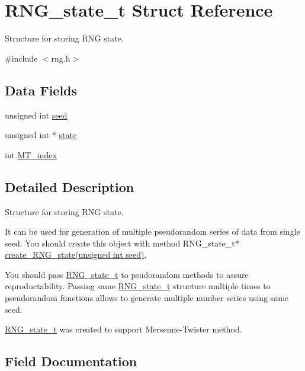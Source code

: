 \hypertarget{structRNG__state__t}{}\section{R\+N\+G\+\_\+state\+\_\+t Struct Reference}
\label{structRNG__state__t}


Structure for storing R\+NG state.  




{\ttfamily \#include $<$rng.\+h$>$}

\subsection*{Data Fields}
\begin{DoxyCompactItemize}
\item 
unsigned int \hyperlink{structRNG__state__t_a5c04ee01672b14c4c6f5d21c45aeb371}{seed}
\item 
unsigned int $\ast$ \hyperlink{structRNG__state__t_a7eb0b3b656d81709d34ecb90ccb21e73}{state}
\item 
int \hyperlink{structRNG__state__t_adc72303a30c6f8a62bdf019191d83acc}{M\+T\+\_\+index}
\end{DoxyCompactItemize}


\subsection{Detailed Description}
Structure for storing R\+NG state. 

It can be used for generation of multiple pseudorandom series of data from single seed. You should create this object with method R\+N\+G\+\_\+state\+\_\+t$\ast$ \hyperlink{rng_8h_af9c03e9b659b227ab093957cbfc57847}{create\+\_\+\+R\+N\+G\+\_\+state(unsigned int seed)}.

You should pass \hyperlink{structRNG__state__t}{R\+N\+G\+\_\+state\+\_\+t} to psudorandom methods to assure reproductability. Passing same \hyperlink{structRNG__state__t}{R\+N\+G\+\_\+state\+\_\+t} structure multiple times to pseudorandom functions allows to generate multiple number series using same seed.

\hyperlink{structRNG__state__t}{R\+N\+G\+\_\+state\+\_\+t} was created to support Mersenne-\/\+Twister method. 

\subsection{Field Documentation}
\mbox{\label{structRNG__state__t_adc72303a30c6f8a62bdf019191d83acc}} 
